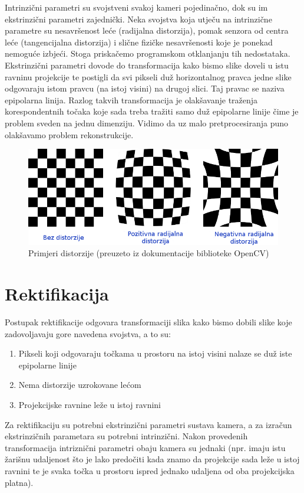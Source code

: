 \documentclass[utf8, zavrsni, numeric]{fer}
\begin{document}
Intrinzični parametri su svojstveni svakoj kameri pojedinačno, dok su im ekstrinzični parametri zajednički. Neka svojstva koja utječu na intrinzične parametre su nesavršenost leće (radijalna distorzija), pomak senzora
od centra leće (tangencijalna distorzija) i slične fizičke nesavršenosti koje je ponekad nemoguće izbjeći. Stoga priskačemo programskom otklanjanju tih nedostataka.
Ekstrinzični parametri dovode do transformacija kako bismo slike doveli u istu ravninu projekcije te postigli da svi pikseli duž horizontalnog pravca jedne slike odgovaraju istom pravcu (na istoj visini) na drugoj slici. Taj pravac se naziva epipolarna linija. Razlog takvih transformacija je olakšavanje traženja korespondentnih točaka koje sada treba tražiti samo duž epipolarne linije čime je problem sveden na jednu dimenziju. Vidimo da uz malo pretprocesiranja puno olakšavamo problem rekonstrukcije.

\begin{figure}[htb]
  \centering
  \includegraphics[width=13cm]{img/distortion_examples.png}
  \caption{Primjeri distorzije (preuzeto iz dokumentacije biblioteke OpenCV)}
  \label{fig:primjeri-distorzije}
\end{figure}

\section{Rektifikacija}
Postupak rektifikacije odgovara transformaciji slika kako bismo dobili slike koje zadovoljavaju gore navedena svojstva, a to su:
\begin{enumerate}
  \item Pikseli koji odgovaraju točkama u prostoru na istoj visini nalaze se duž iste epipolarne linije
  \item Nema distorzije uzrokovane lećom
  \item Projekcijske ravnine leže u istoj ravnini
\end{enumerate}
Za rektifikaciju su potrebni ekstrinzični parametri sustava kamera, a za izračun ekstrinzičnih parametara su potrebni intrinzični.
Nakon provedenih transformacija intriznični parametri obaju kamera su jednaki (npr. imaju istu žarišnu udaljenost što je lako predočiti kada znamo da projekcije sada leže u istoj ravnini te je svaka točka
u prostoru ispred jednako udaljena od oba projekcijska platna).
\end{document}
